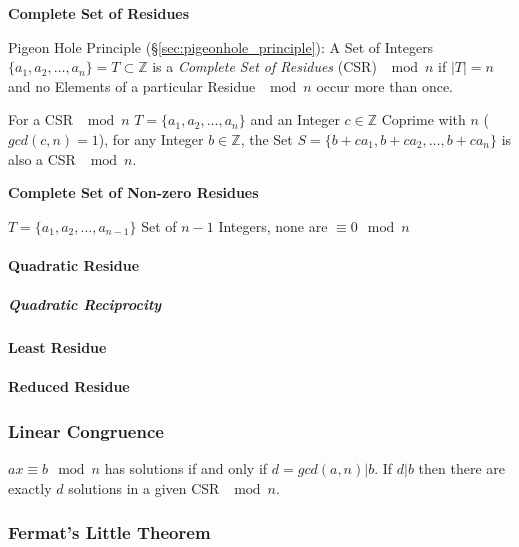 \textbf{Complete Set of Residues}

Pigeon Hole Principle (\S\ref{sec:pigeonhole_principle}): A Set of Integers
$\{a_1, a_2, \ldots, a_n\} = T \subset \mathbb{Z}$ is a \emph{Complete Set of
  Residues} (CSR) $\mod n$ if $|T| = n$ and no Elements of a particular Residue
$\mod n$ occur more than once.

For a CSR $\mod n$ $T = \{a_1, a_2, \ldots, a_n\}$ and an Integer $c \in
\mathbb{Z}$ Coprime with $n$ ($gcd(c,n) = 1$), for any Integer $b \in
\mathbb{Z}$, the Set $S = \{b + ca_1, b + ca_2, \ldots, b + ca_n \}$ is also a
CSR $\mod n$.



\textbf{Complete Set of Non-zero Residues}

$T = \{ a_1, a_2, \ldots, a_{n-1} \}$ Set of $n-1$ Integers, none are
$\equiv 0 \mod n$



\paragraph{Quadratic Residue}\label{sec:quadratic_residue}\hfill

\subparagraph{Quadratic Reciprocity}\label{sec:quadratic_reciprocity}\hfill



\paragraph{Least Residue}\label{sec:least_residue}\hfill

\paragraph{Reduced Residue}\label{sec:reduced_residue}\hfill



\subsubsection{Linear Congruence}\label{sec:linear_congruence}

$ax \equiv b \mod n$ has solutions if and only if $d = gcd(a,n) | b$.
If $d|b$ then there are exactly $d$ solutions in a given CSR $\mod n$.



\subsubsection{Fermat's Little Theorem}\label{sec:fermat_little}

